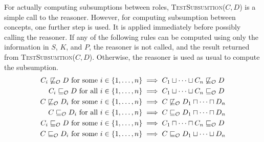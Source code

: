 For actually computing subsumptions between roles, \textsc{TestSubsumtion($C, D$)} is a simple call to the reasoner. However, for computing subsumption between concepts, one further step is used. It is applied immediately before possibly calling the reasoner. If any of the following rules can be computed using only the information in $S$, $K$, and $P$, the reasoner is not called, and the result returned from \textsc{TestSubsumtion($C, D$)}. Otherwise, the reasoner is used as usual to compute the subsumption.
\begin{align*}
  C_i \not\sqsubseteq_\mathcal{O} D \text{ for some } i \in \{ 1, \dots, n \} &\implies C_1 \sqcup \cdots \sqcup C_n \not\sqsubseteq_\mathcal{O} D \\
  C_i \sqsubseteq_\mathcal{O} D \text{ for all } i \in \{ 1, \dots, n \} &\implies C_1 \sqcup \cdots \sqcup C_n \sqsubseteq_\mathcal{O} D \\
  C \not\sqsubseteq_\mathcal{O} D_i \text{ for some } i \in \{ 1, \dots, n \} &\implies C \not\sqsubseteq_\mathcal{O} D_1 \sqcap \cdots \sqcap D_n \\
  C \sqsubseteq_\mathcal{O} D_i \text{ for all } i \in \{ 1, \dots, n \} &\implies C \sqsubseteq_\mathcal{O} D_1 \sqcap \cdots \sqcap D_n \\
  C_i \sqsubseteq_\mathcal{O} D \text{ for some } i \in \{ 1, \dots, n \} &\implies C_1 \sqcap \dots \sqcap C_n \sqsubseteq_\mathcal{O} D \\
  C \sqsubseteq_\mathcal{O} D_i \text{ for some } i \in \{ 1, \dots, n \} &\implies C \sqsubseteq_\mathcal{O} D_1 \sqcup \cdots \sqcup D_n \\
\end{align*}


